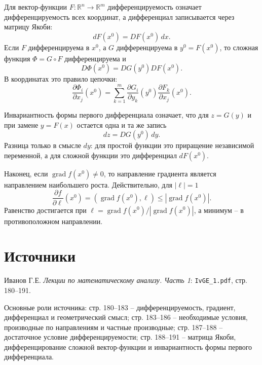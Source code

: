 \documentclass[12pt,a4paper]{article}
\newcommand{\R}{\mathbb{R}}
\newcommand{\grad}{\operatorname{grad}}
\newcommand{\Jac}{D}
\begin{document}
Для вектор-функции \(F:\R^n\to\R^m\) дифференцируемость означает
дифференцируемость всех координат, а дифференциал записывается через матрицу
Якоби:
\[
  dF(x^0)=\Jac F(x^0)\,dx.
\]
Если \(F\) дифференцируема в \(x^0\), а \(G\) дифференцируема в
\(y^0=F(x^0)\), то сложная функция \(\Phi=G\circ F\) дифференцируема и
\[
  \Jac\Phi(x^0)=\Jac G(y^0)\Jac F(x^0).
\]
В координатах это правило цепочки:
\[
  \frac{\partial \Phi_i}{\partial x_j}(x^0)
  =
  \sum_{k=1}^m
  \frac{\partial G_i}{\partial y_k}(y^0)
  \frac{\partial F_k}{\partial x_j}(x^0).
\]

Инвариантность формы первого дифференциала означает, что для \(z=G(y)\) и при
замене \(y=F(x)\) остается одна и та же запись
\[
  dz=\Jac G(y^0)\,dy.
\]
Разница только в смысле \(dy\): для простой функции это приращение независимой
переменной, а для сложной функции это дифференциал \(dF(x^0)\).

Наконец, если \(\grad f(x^0)\ne0\), то направление градиента является
направлением наибольшего роста. Действительно, для \(|\ell|=1\)
\[
  \frac{\partial f}{\partial\ell}(x^0)=(\grad f(x^0),\ell)
  \le |\grad f(x^0)|.
\]
Равенство достигается при
\(\ell=\grad f(x^0)/|\grad f(x^0)|\), а минимум -- в противоположном
направлении.

\section*{Источники}

Иванов Г.Е. \emph{Лекции по математическому анализу. Часть 1}:
\texttt{IvGE\_1.pdf}, стр. 180--191.

Основные роли источника: стр. 180--183 -- дифференцируемость, градиент,
дифференциал и геометрический смысл; стр. 183--186 -- необходимые условия,
производные по направлениям и частные производные; стр. 187--188 --
достаточное условие дифференцируемости; стр. 188--191 -- матрица Якоби,
дифференцирование сложной вектор-функции и инвариантность формы первого
дифференциала.
\end{document}
